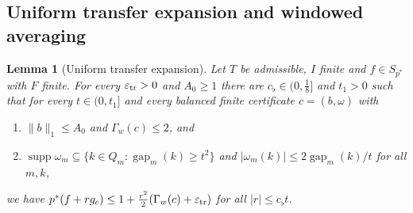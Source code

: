 \documentclass[10pt]{amsart}
\newtheorem{lemma}[theorem]{Lemma}
\theoremstyle{definition}
\theoremstyle{remark}
\newcommand{\supp}{\operatorname{supp}}
\newcommand{\gap}{\operatorname{gap}}
\begin{document}
\subsection{Uniform transfer expansion and windowed averaging}

\begin{lemma}[Uniform transfer expansion]\label{lem:uniformtransfer}
Let $T$ be admissible, $I$ finite and $f\in S_{p^*}$ with $F$ finite.  For
every $\varepsilon_{\rm tr}>0$ and $A_0\ge1$ there are $c_{\flat}\in(0,\frac18]$ and
$t_1>0$ such that for every $t\in(0,t_1]$ and every balanced finite
certificate $c=(b,\omega)$ with
\begin{enumerate}
\item[(C-a)] $\|b\|_1\le A_0$ and $\Gamma_w(c)\le2$, and
\item[(C-b)] $\supp\omega_m\subseteq\{k\in Q_m:\gap_m(k)\ge t^2\}$ and
$|\omega_m(k)|\le2\gap_m(k)/t$ for all $m,k$,
\end{enumerate}
we have $p^*(f+rg_c)\le1+\frac{r^2}2(\Gamma_w(c)+\varepsilon_{\rm tr})$ for
all $|r|\le c_{\flat}t$.
\end{lemma}
\end{document}

